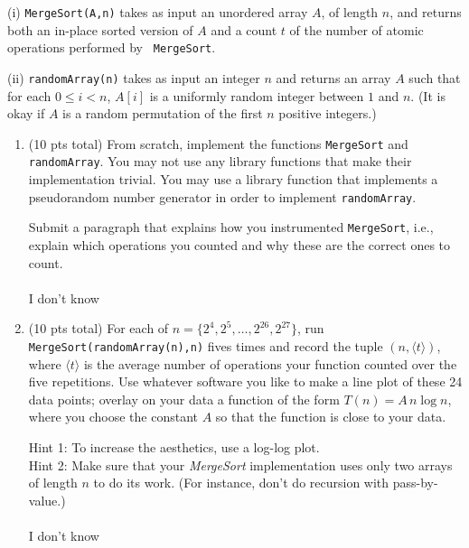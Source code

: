 \documentclass[12pt]{article}
\begin{document}
\begin{enumerate}
        (i) {\tt MergeSort(A,n)} takes as input an unordered array $A$, of
        length $n$, and returns both an in-place sorted version of $A$ and a
        count $t$ of the number of atomic operations performed by {\tt
        MergeSort}.
	
        (ii) {\tt randomArray(n)} takes as input an integer $n$ and returns an
        array $A$ such that for each $0 \leq i < n$, $A[i]$ is a uniformly
        random integer between $1$ and $n$. (It is okay if $A$ is a random
        permutation of the first $n$ positive integers.)
\pagebreak
		
	\begin{enumerate}
            \item (10 pts total) \label{3a} From scratch, implement the functions {\tt MergeSort} and {\tt
            randomArray}. You may not use any library functions that make their
                implementation trivial. You may use a library function that
                implements a pseudorandom number generator in order to
                implement {\tt randomArray}. 
	
        Submit a paragraph that explains how you instrumented {\tt MergeSort},
                i.e., explain which operations you counted and why these are
                the correct ones to count.
\\ \\ I don't know
\pagebreak
	
        \item (10 pts total)  \label{3b} For each of $n= \{2^{4},2^{5},\dots,2^{26},2^{27}\}$, run 
            {\tt MergeSort(randomArray(n),n)} fives times and record the tuple
            $(n,\langle t\rangle)$, where $\langle t\rangle$ is the average
            number of operations your function counted over the five
            repetitions. Use whatever software you like to make a line plot
            of these 24 data points; overlay on your data a function of the
            form $T(n) = A\,n \log n$, where you choose the constant $A$ so
            that the function is close to your data.
	
	Hint 1: To increase the aesthetics, use a log-log plot.\\
        Hint 2: Make sure that your \textit{MergeSort} implementation uses only
                two arrays of length $n$ to do its work. (For instance, don't
                do recursion with pass-by-value.)
\\ \\ I don't know
\pagebreak
	
	\end{enumerate}
	

\end{enumerate}
\end{document}
